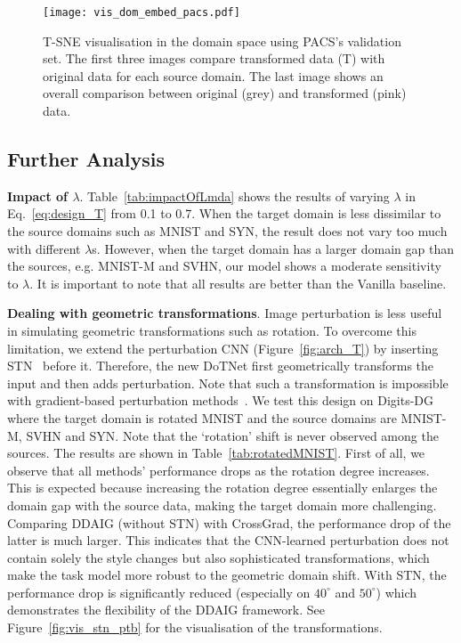 \documentclass[letterpaper]{article}
\newcommand{\keypoint}[1]{\vspace{0.1cm}\noindent\textbf{#1}}
\begin{document}
\begin{figure*}[t]
\centering
\texttt{[image: vis\_dom\_embed\_pacs.pdf]}
\caption{\small T-SNE visualisation in the domain space using PACS's validation set. The first three images compare transformed data (T) with original data for each source domain. The last image shows an overall comparison between original (grey) and transformed (pink) data.}
\label{fig:vis_dom_embed_pacs}
\vspace{-0.1cm}
\end{figure*}


\subsection{Further Analysis}
\keypoint{Impact of $\lambda$}.
Table~\ref{tab:impactOfLmda} shows the results of varying $\lambda$ in Eq.~\ref{eq:design_T} from 0.1 to 0.7. When the target domain is less dissimilar to the source domains such as MNIST and SYN, the result does not vary too much with different $\lambda$s. However, when the target domain has a larger domain gap than the sources, e.g. MNIST-M and SVHN, our model shows a moderate sensitivity to $\lambda$. It is important to note that all results are better than the Vanilla baseline.

\keypoint{Dealing with geometric transformations}.
Image perturbation is less useful in simulating geometric transformations such as rotation. To overcome this limitation, we extend the perturbation CNN (Figure~\ref{fig:arch_T}) by inserting STN~\cite{nips15stn} before it. Therefore, the new DoTNet first geometrically transforms the input and then adds perturbation. Note that such a transformation is  impossible with gradient-based perturbation methods~\cite{shankar2018generalizing}.
We test this design on Digits-DG where the target domain is rotated MNIST and the source domains are MNIST-M, SVHN and SYN. Note that the `rotation' shift is never observed among the sources.
The results are shown in Table~\ref{tab:rotatedMNIST}. First of all, we observe that all methods' performance drops as the rotation degree increases. This is expected because increasing the rotation degree essentially enlarges the domain gap with the source data, making the target domain more challenging.
Comparing DDAIG (without STN) with CrossGrad, the performance drop of the latter is much larger. This indicates that the CNN-learned perturbation does not contain solely the style changes but also sophisticated transformations, which make the task model more robust to the geometric domain shift.
With STN, the performance drop is significantly reduced (especially on $40^\circ$ and $50^\circ$) which demonstrates the flexibility of the DDAIG framework.
See Figure~\ref{fig:vis_stn_ptb} for the visualisation of the transformations.
\end{document}
